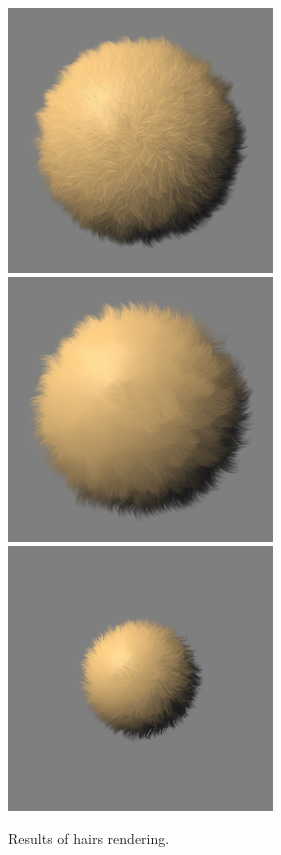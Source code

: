 \begin{figure}[H]
    \begin{center}
    \includegraphics[width=70mm, height=70mm]{Resultats/bouledepoil1/final.png}
    \includegraphics[width=70mm, height=70mm]{Resultats/bouledepoil2/final.png}
    \includegraphics[width=70mm, height=70mm]{Resultats/bouledepoilFractalized/final.png}
    \end{center}
    \caption{Results of hairs rendering.}
    \label{results_hairs}
\end{figure}


